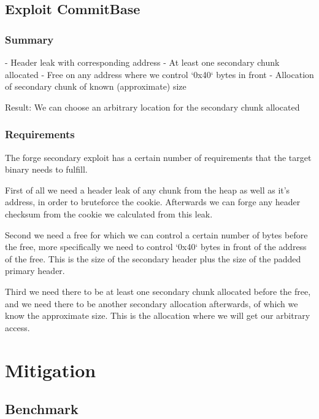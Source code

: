 \documentclass[a4paper,11pt,oneside]{report}
\begin{document}
\section{Exploit CommitBase}

\subsection{Summary}

- Header leak with corresponding address
- At least one secondary chunk allocated
- Free on any address where we control `0x40` bytes in front
- Allocation of secondary chunk of known (approximate) size

Result:
We can choose an arbitrary location for the secondary chunk allocated

\subsection{Requirements}

The forge secondary exploit has a certain number of requirements that the target binary needs to fulfill.

First of all we need a header leak of any chunk from the heap as well as it's address, in order to bruteforce the cookie. Afterwards we can forge any header checksum from the cookie we calculated from this leak.

Second we need a free for which we can control a certain number of bytes before the free, more specifically we need to control `0x40` bytes in front of the address of the free. This is the size of the secondary header plus the size of the padded primary header.

Third we need there to be at least one secondary chunk allocated before the free, and we need there to be another secondary allocation afterwards, of which we know the approximate size. This is the allocation where we will get our arbitrary access.




\chapter{Mitigation}



\section{Benchmark}
\end{document}
